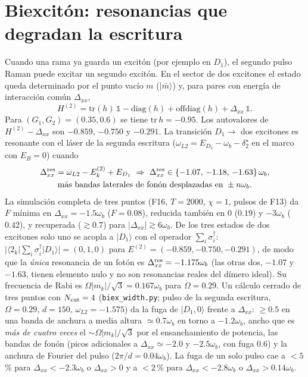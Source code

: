 \documentclass[11pt,a4paper]{article}
\newcommand{\ket}[1]{|#1\rangle}
\newcommand{\wb}{\omega_b}
\newcommand{\Dxx}{\Delta_{xx}}
\begin{document}
\section{Biexcitón: resonancias que degradan la escritura}\label{sec:biexc}
Cuando una rama ya guarda un excitón (por ejemplo en $D_1$), el segundo pulso Raman puede excitar un segundo excitón. En el sector de dos excitones el estado queda
determinado por el punto vacío $m$ ($\ket{\bar m}$) y, para pares con energía de interacción común $\Dxx$,
\begin{equation}
H^{(2)}=\mathrm{tr}(h)\,\mathbb 1-\mathrm{diag}(h)+\mathrm{offdiag}(h)+\Dxx\,\mathbb 1 .
\end{equation}
Para $(G_1,G_2)=(0.35,0.6)$ se tiene $\mathrm{tr}\,h=-0.95$.
Los autovalores de $H^{(2)}-\Dxx$ son $-0.859$, $-0.750$ y $-0.291$.
La transición $D_1\to$ dos excitones es resonante con el láser de la segunda escritura ($\omega_{L2}=E_{D_2}-\wb-\delta_2^\star$ en el marco con $E_B=0$) cuando
\begin{gather}
\Dxx^{\rm res}=\omega_{L2}-E^{(2)}_k+E_{D_1}\ \Rightarrow\ \Dxx^{\rm res}\in\{-1.07,\,-1.18,\,-1.63\}\,\wb,\nonumber\\
\text{más bandas laterales de fonón desplazadas en }\pm n\wb .
\end{gather}
La simulación completa de tres puntos (F16, $T=2000$, $\chi=1$, pulsos de F13) da $F$ mínima en $\Dxx=-1.5\wb$ ($F=0.08$), reducida también en $0$ ($0.19$) y $-3\wb$ ($0.42$),
y recuperada ($\gtrsim0.7$) para $|\Dxx|\gtrsim6\wb$.
De los tres estados de dos excitones solo uno se acopla a $\ket{D_1}$ con el operador $\sum_i\sigma_i^\dagger$: $|\langle2_k|\sum_i\sigma_i^\dagger|D_1\rangle|=(0,1,0)$ para $E^{(2)}=(-0.859,-0.750,-0.291)$, de modo que la \emph{única} resonancia de un fotón es $\Dxx^{\rm res}=-1.175\wb$ (las otras dos, $-1.07$ y $-1.63$, tienen elemento nulo y no son resonancias reales del dímero ideal). Su frecuencia de Rabi es $\Omega|m_k|/\sqrt3=0.167\wb$ para $\Omega=0.29$.
Un cálculo cerrado de tres puntos con $N_{\rm cut}=4$ (\texttt{biex\_width.py}; pulso de la segunda escritura, $\Omega=0.29$, $d=150$, $\omega_{L2}=-1.575$) da la fuga de $\ket{D_1,0}$ frente a $\Dxx$: $\ge0.5$ en una banda de anchura a media altura $\simeq0.7\wb$ en torno a $-1.2\wb$, ancho que es \emph{más de cuatro veces} el $\sim\Omega|m_k|/\sqrt3$ por el ensanchamiento de potencia, las bandas de fonón (picos adicionales a $\Dxx\simeq-2.0$ y $-2.5\wb$, con fuga $0.6$) y la anchura de Fourier del pulso ($2\pi/d=0.04\wb$). La fuga de un solo pulso cae a $<5$\,\% para $\Dxx<-2.3\wb$ o $\Dxx>0$ y a $<2$\,\% para $\Dxx<-2.8\wb$ o $\Dxx>0.14\wb$.
\end{document}
